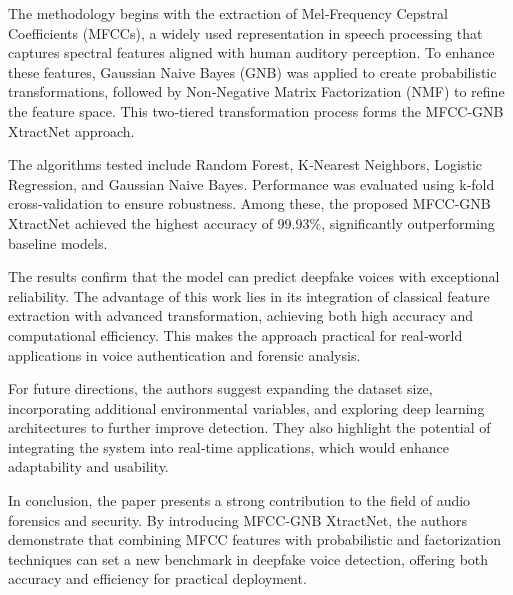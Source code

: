 \documentclass[12pt,a4paper]{report}
\begin{document}
The methodology begins with the extraction of Mel‑Frequency Cepstral Coefficients (MFCCs), a widely used representation in speech processing that captures spectral features aligned with human auditory perception. To enhance these features, Gaussian Naive Bayes (GNB) was applied to create probabilistic transformations, followed by Non‑Negative Matrix Factorization (NMF) to refine the feature space. This two‑tiered transformation process forms the MFCC‑GNB XtractNet approach.  

The algorithms tested include Random Forest, K‑Nearest Neighbors, Logistic Regression, and Gaussian Naive Bayes. Performance was evaluated using k‑fold cross‑validation to ensure robustness. Among these, the proposed MFCC‑GNB XtractNet achieved the highest accuracy of 99.93\%, significantly outperforming baseline models.  

The results confirm that the model can predict deepfake voices with exceptional reliability. The advantage of this work lies in its integration of classical feature extraction with advanced transformation, achieving both high accuracy and computational efficiency. This makes the approach practical for real‑world applications in voice authentication and forensic analysis.  

For future directions, the authors suggest expanding the dataset size, incorporating additional environmental variables, and exploring deep learning architectures to further improve detection. They also highlight the potential of integrating the system into real‑time applications, which would enhance adaptability and usability.  

In conclusion, the paper presents a strong contribution to the field of audio forensics and security. By introducing MFCC‑GNB XtractNet, the authors demonstrate that combining MFCC features with probabilistic and factorization techniques can set a new benchmark in deepfake voice detection, offering both accuracy and efficiency for practical deployment.  

\renewcommand{\arraystretch}{1.5}
\end{document}
